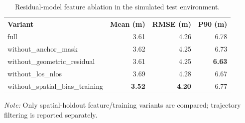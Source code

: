 \begin{table}[t]
\centering
\caption{Residual-model feature ablation in the simulated test environment.}
\label{tab:ablation}
\small
\begin{tabular}{lrrr}
\toprule
Variant & Mean (m) & RMSE (m) & P90 (m) \\
\midrule
full & 3.61 & 4.26 & 6.78 \\
without\_anchor\_mask & 3.62 & 4.25 & 6.73 \\
without\_geometric\_residual & 3.61 & 4.25 & \textbf{6.63} \\
without\_los\_nlos & 3.69 & 4.28 & 6.67 \\
without\_spatial\_bias\_training & \textbf{3.52} & \textbf{4.20} & 6.77 \\
\bottomrule
\end{tabular}
\par\smallskip\footnotesize\textit{Note:} Only spatial-holdout feature/training variants are compared; trajectory filtering is reported separately.
\end{table}
